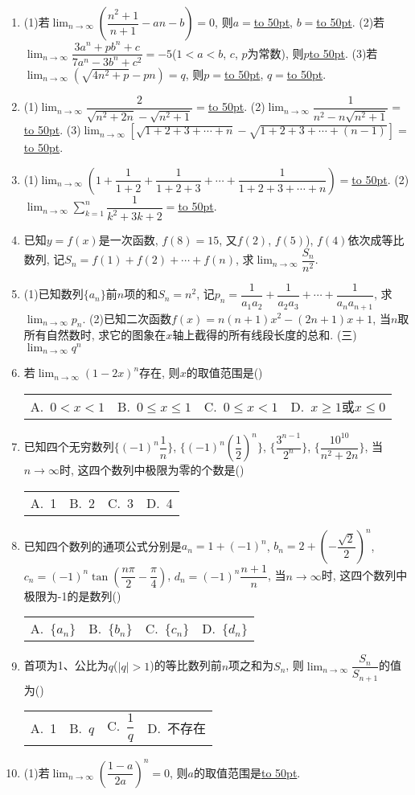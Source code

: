 \documentclass[10pt,a4paper]{article}
\newcommand{\blank}[1]{\underline{\hbox to #1pt{}}}
\newcommand{\fourch}[4]{\par\begin{tabular}{p{.23\textwidth}p{.23\textwidth}p{.23\textwidth}p{.23\textwidth}}
A.~#1 &B.~#2& C.~#3& D.~#4
\end{tabular}}
\begin{document}
\begin{enumerate}[1.]
\fourch{2}{$\dfrac 73$}{$\dfrac 95$}{$\dfrac 37$}
\item (1)若$\displaystyle \lim_{n\to \infty} (\dfrac{{n^2}+1}{n+1}-an-b)=0$, 则$a=$\blank{50}, $b=$\blank{50}.
(2)若$\displaystyle \lim_{n\to \infty} \dfrac{3{a^n}+p{b^n}+c}{7{a^n}-3{b^n}+{c^2}}=-5$($1<a<b$, $c$, $p$为常数), 则$p$\blank{50}.
(3)若$\displaystyle \lim_{n\to \infty} (\sqrt {4n^2+p}-pn)=q$, 则$p=$\blank{50}, $q=$\blank{50}.
\item (1)$\displaystyle \lim_{n\to \infty} \dfrac 2{\sqrt {n^2+2n}-\sqrt {n^2+1}}=$\blank{50}.
(2)$\displaystyle \lim_{n\to \infty} \dfrac 1{n^2-n\sqrt {n^2+1}}=$\blank{50}.
(3)$\displaystyle \lim_{n\to \infty} [\sqrt {1+2+3+\cdots +n}-\sqrt {1+2+3+\cdots +(n-1)}]=$\blank{50}.
\item (1)$\displaystyle \lim_{n\to \infty} (1+\dfrac 1{1+2}+\dfrac 1{1+2+3}+\cdots +\dfrac 1{1+2+3+\cdots +n})=$\blank{50}.
(2)$\displaystyle \lim_{n\to \infty} \sum\limits_{k=1}^n\dfrac 1{k^2+3k+2}=$\blank{50}.
\item 已知$y=f(x)$是一次函数, $f(8)=15$, 又$f(2)$, $f(5)$), $f(4)$依次成等比数列, 记$S_n=f(1)+f(2)+\cdots +f(n)$, 求$\displaystyle \lim_{n\to \infty} \dfrac{S_n}{n^2}$.
\item (1)已知数列$\{a_n\}$前$n$项的和$S_n=n^2$, 记$p_n=\dfrac 1{a_1a_2}+\dfrac 1{a_2a_3}+\cdots +\dfrac 1{a_na_{n+1}}$, 求$\displaystyle \lim_{n\to \infty} p_n$.
(2)已知二次函数$f(x)=n(n+1)x^2-(2n+1)x+1$, 当$n$取所有自然数时, 求它的图象在$x$轴上截得的所有线段长度的总和.
(三)$\displaystyle \lim_{n\to \infty} q^n$
\item 若$\displaystyle \lim_{n\to \infty} (1-2x)^n$存在, 则$x$的取值范围是()
\fourch{$0<x<1$}{$0\le x\le 1$}{$0\le x<1$}{$x\ge 1$或$x\le 0$}
\item 已知四个无穷数列$\{(-1)^n\dfrac 1n\}$, $\{(-1)^n(\dfrac 12)^n\}$, $\{\dfrac{{3^{n-1}}}{2^n}\}$, $\{\dfrac{{{10}^{10}}}{{n^2}+2n}\}$, 当$n\to \infty$时, 这四个数列中极限为零的个数是()
\fourch{1}{2}{3}{4}
\item 已知四个数列的通项公式分别是$a_n=1+(-1)^n$, $b_n=2+(-\dfrac{\sqrt 2}2)^n$, $c_n=(-1)^n\tan (\dfrac{n\pi }2-\dfrac{\pi }4)$, $d_n=(-1)^n\dfrac{n+1}n$, 当$n\to \infty$时, 这四个数列中极限为-1的是数列()
\fourch{$\{a_n\}$}{$\{b_n\}$}{$\{c_n\}$}{$\{d_n\}$}
\item 首项为1、公比为$q$($|q|>1$)的等比数列前$n$项之和为$S_n$, 则$\displaystyle \lim_{n\to \infty} \dfrac{S_n}{{S_{n+1}}}$的值为()
\fourch{1}{$q$}{$\dfrac 1q$}{不存在}
\item (1)若$\displaystyle \lim_{n\to \infty} (\dfrac{1-a}{2a})^n=0$, 则$a$的取值范围是\blank{50}.

\end{enumerate}
\end{document}
